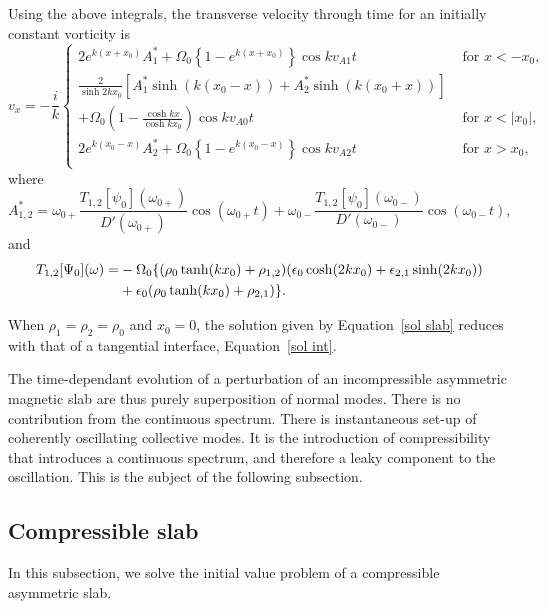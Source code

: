 \documentclass[12pt]{../style-files/ociamthesis}
\begin{document}
Using the above integrals, the transverse velocity through time for an initially constant vorticity is
\begin{equation}
v_x = -\frac{i}{k}\begin{cases}
2 e^{k(x+x_0)} A^*_1 + \Omega_0 \left\{1 - e^{k(x+x_0)}\right\} \cos{kv_{A1}t} \quad &\text{ for } x<-x_0, \\
\frac{2}{\sinh{2kx_0}} \left[ A^*_1 \sinh(k(x_0 - x)) + A^*_2 \sinh(k(x_0 + x)) \right] & \\
+ \Omega_0 \left( 1 - \frac{\cosh{kx}}{\cosh{kx_0}} \right)\cos{kv_{A0}t} \quad &\text{ for } x < |x_0|, \\
2 e^{k(x_0-x)} A^*_2 + \Omega_0 \left\{1 - e^{k(x_0-x)}\right\} \cos{kv_{A2}t} \quad &\text{ for } x>x_0, \\
\end{cases}
\label{sol slab}
\end{equation}
where
\begin{equation}
A^*_{1,2} = \omega_{0+} \frac{T_{1,2}[\psi_0](\omega_{0+})}{D'(\omega_{0+})} \cos(\omega_{0+} t) + \omega_{0-}\frac{T_{1,2}[\psi_0](\omega_{0-})}{D'(\omega_{0-})} \cos(\omega_{0-} t),
\end{equation}
and
\begin{align}
T_{1,2}[\Psi_0](\omega) = &-\Omega_0\{ (\rho_0 \tanh(kx_0) + \rho_{1,2}) (\epsilon_0 \cosh(2kx_0) + \epsilon_{2,1}\sinh(2kx_0)) \notag \\
&+ \epsilon_0(\rho_0 \tanh(kx_0) + \rho_{2,1}) \}.
\end{align}

When $\rho_1 = \rho_2 = \rho_0$ and $x_0 = 0$, the solution given by Equation~\eqref{sol slab} reduces with that of a tangential interface, Equation~\eqref{sol int}.

The time-dependant evolution of a perturbation of an incompressible asymmetric magnetic slab are thus purely superposition of normal modes. There is no contribution from the continuous spectrum. There is instantaneous set-up of coherently oscillating collective modes. It is the introduction of compressibility that introduces a continuous spectrum, and therefore a leaky component to the oscillation. This is the subject of the following subsection.


\subsection{Compressible slab}

In this subsection, we solve the initial value problem of a compressible asymmetric slab. 
\end{document}
